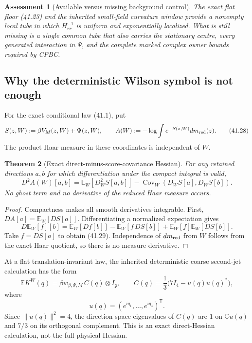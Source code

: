 \documentclass[11pt,oneside]{book}
\newtheorem{theorem}{Theorem}[chapter]
\newtheorem{assessment}[theorem]{Assessment}
\theoremstyle{definition}
\theoremstyle{remark}
\begin{document}
\begin{assessment}[Available versus missing background control]
\label{ass:e8v41-background-control}
The exact flat floor (41.23) and the inherited small-field curvature
window provide a nonempty local tube in which \(H_{rr}^{-1}\) is
uniform and exponentially localized.  What is still missing is a
single common tube that also carries the stationary centre, every
generated interaction in \(\Psi\), and the complete marked complex
owner bounds required by CPBC.
\end{assessment}

\subsection{Why the deterministic Wilson symbol is not enough}

For the exact conditional law (41.1), put
\[
 S(z,W):=\beta V_M(z,W)+\Psi(z,W),
 \qquad
 A(W):=-\log\int e^{-S(z,W)}dm_{\rm red}(z).                    \tag{41.28}
\]
The product Haar measure in these coordinates is independent of
\(W\).

\begin{theorem}[Exact direct-minus-score-covariance Hessian]
\label{thm:e8v41-partition-hessian}
For any retained directions \(a,b\) for which differentiation under
the compact integral is valid,
\[
 \boxed{
 D^2A(W)[a,b]
 =\mathbb E_W[D_W^2S[a,b]]
 -\operatorname{Cov}_W(D_WS[a],D_WS[b]).}                       \tag{41.29}
\]
No ghost term and no derivative of the reduced Haar measure occurs.
\end{theorem}

\begin{proof}
Compactness makes all smooth derivatives integrable.  First,
\(DA[a]=\mathbb E_W[DS[a]]\).  Differentiating a normalized
expectation gives
\[
 D\mathbb E_W[f][b]
 =\mathbb E_W[Df[b]]
 -\mathbb E_W[f\,DS[b]]
 +\mathbb E_W[f]\mathbb E_W[DS[b]].
\]
Take \(f=DS[a]\) to obtain (41.29).  Independence of
\(dm_{\rm red}\) from \(W\) follows from the exact Haar quotient,
so there is no measure derivative.
\end{proof}

At a flat translation-invariant law, the inherited deterministic
coarse second-jet calculation has the form
\[
 \mathbb E K^W(q)
 =\beta w_{\beta,\Psi,M}\,C(q)\otimes I_{\mathfrak g},
 \qquad
 C(q)=\frac13\bigl(7I_4-u(q)u(q)^*\bigr),                       \tag{41.30}
\]
where
\[
 u(q)=(e^{iq_1},\ldots,e^{iq_4})^{\mathsf T}.                   \tag{41.31}
\]
Since \(\|u(q)\|^2=4\), the direction-space eigenvalues of \(C(q)\)
are \(1\) on \(\mathbb Cu(q)\) and \(7/3\) on its orthogonal
complement.  This is an exact direct-Hessian calculation, not the
full physical Hessian.
\end{document}

